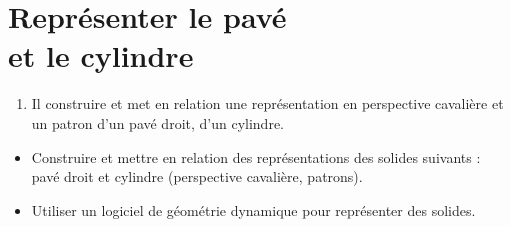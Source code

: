 \themaE
\graphicspath{{../../S24_Representer_le_pave_et_le_cylindre/Images/}}

\chapter{Représenter le pavé\\et le cylindre}
\label{S24}


\newcommand{\cubiso}[2]     
   {\rput(#1,#2) 
      {\psset{fillstyle=solid}
       \pspolygon[fillcolor=purple!80](0,0)(2;90)(2;30)(2;-30)
       \pspolygon[fillcolor=lightgray](2;-30)(3.464;0)(4;30)(2;30)
       \pspolygon[fillcolor=teal](2;90)(2;30)(4;30)(3.464;60)}}


\begin{autoeval}
   \small
   \begin{enumerate}
      \item Il construire et met en relation une représentation en perspective cavalière et un patron d'un pavé droit, d'un cylindre. 
   \end{enumerate}
\end{autoeval}

\begin{prerequis}
   \begin{itemize}
      \item[\com] Construire et mettre en relation des représentations des solides suivants : pavé droit et cylindre (perspective cavalière, patrons).
      \item[\com] Utiliser un logiciel de géométrie dynamique pour représenter des solides.
   \end{itemize}
\end{prerequis}

\vfill


